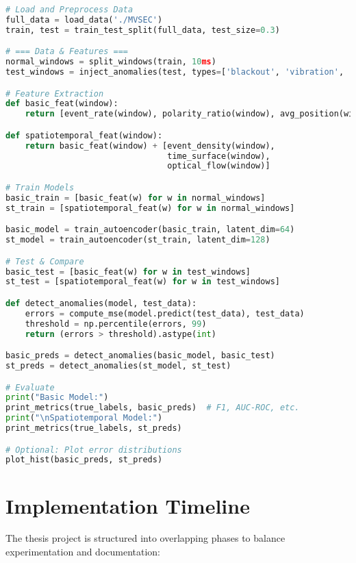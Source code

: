 \documentclass[12pt,a4paper]{article}
\begin{document}
\begin{lstlisting}[language=Python, basicstyle=\small\ttfamily, frame=single, breaklines=true]
# Load and Preprocess Data
full_data = load_data('./MVSEC')
train, test = train_test_split(full_data, test_size=0.3)

# === Data & Features ===
normal_windows = split_windows(train, 10ms)
test_windows = inject_anomalies(test, types=['blackout', 'vibration', 'flip'], ratio=50%)

# Feature Extraction
def basic_feat(window):
    return [event_rate(window), polarity_ratio(window), avg_position(window)]

def spatiotemporal_feat(window):
    return basic_feat(window) + [event_density(window),
                                 time_surface(window),
                                 optical_flow(window)]

# Train Models
basic_train = [basic_feat(w) for w in normal_windows]
st_train = [spatiotemporal_feat(w) for w in normal_windows]

basic_model = train_autoencoder(basic_train, latent_dim=64)
st_model = train_autoencoder(st_train, latent_dim=128)

# Test & Compare
basic_test = [basic_feat(w) for w in test_windows]
st_test = [spatiotemporal_feat(w) for w in test_windows]

def detect_anomalies(model, test_data):
    errors = compute_mse(model.predict(test_data), test_data)
    threshold = np.percentile(errors, 99)
    return (errors > threshold).astype(int)

basic_preds = detect_anomalies(basic_model, basic_test)
st_preds = detect_anomalies(st_model, st_test)

# Evaluate
print("Basic Model:")
print_metrics(true_labels, basic_preds)  # F1, AUC-ROC, etc.
print("\nSpatiotemporal Model:")
print_metrics(true_labels, st_preds)

# Optional: Plot error distributions
plot_hist(basic_preds, st_preds)
\end{lstlisting}

\section{Implementation Timeline}

The thesis project is structured into overlapping phases to balance experimentation and documentation:
\end{document}
